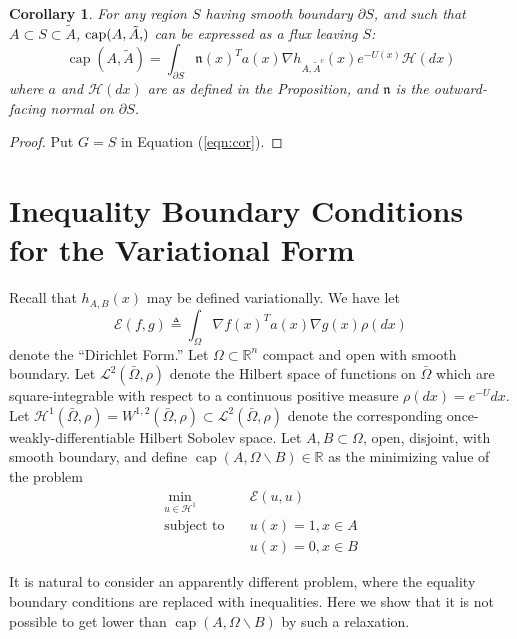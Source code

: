 \documentclass[nofootinbib,english, aip, jcp, priprint, graphicx,floatfix]{revtex4-1}
\newtheorem*{corollary*}{Corollary}
\theoremstyle{plain}
\theoremstyle{definition}
\theoremstyle{plain}
\newcommand{\normal}{{\mathfrak{n}}}
\newcommand{\capac}[2]{\ensuremath{\operatorname{cap}}(#1,#2)}
\newcommand{\hausdorffmeasure}{\mathscr{H}(dx)}
\newcommand{\tA}{{\tilde A}}
\begin{document}
\begin{corollary*}
For any region $S$ having smooth boundary $\partial S$, and such that $A\subset S \subset \tilde A$, $\capac{A,\tA}$ can be expressed as a flux leaving $S$:
\begin{equation*}
\ensuremath{\operatorname{cap}} (A, \tilde{A}) = \int_{\partial S}   \normal(x)^T a (x) \nabla h_{A, \tilde{A}^c} (x)e^{- U (x)} \hausdorffmeasure
\end{equation*}
where $a$ and $\hausdorffmeasure$ are as defined in the Proposition, and  $\normal$ is the outward-facing normal on $\partial S$.
\end{corollary*}
\begin{proof}
Put $G=S$ in Equation (\ref{eqn:cor}).
\end{proof}

%
%
%
%
%
%
%
%
%
%

\section{Inequality Boundary Conditions for the Variational Form}
\label{sec:inequalityboundaryvar}

Recall that $h_{A,B}(x)$ may be defined variationally.  We have let 
%
\[
\mathscr{E}(f,g)\triangleq \int_\Omega \nabla f(x)^T a(x) \nabla g(x) \rho(dx)
\]
%
denote the ``Dirichlet Form.''  Let $\Omega \subset \mathbb{R}^n$ compact and open with smooth boundary.  Let $\mathscr L^2(\bar \Omega,\rho)$ denote the Hilbert space of functions on $\bar \Omega$ which are square-integrable with respect to a continuous positive measure $\rho(dx)=e^{-U}dx$.  Let $\mathcal{H}^1(\bar \Omega,\rho)=W^{1,2}(\bar \Omega,\rho) \subset \mathscr{L}^2(\bar \Omega,\rho)$ denote the corresponding once-weakly-differentiable Hilbert Sobolev space.  Let $A,B\subset \Omega$, open, disjoint, with smooth boundary, and define $\capac{A}{\Omega \backslash B} \in \mathbb{R}$ as the minimizing value of the problem
    \begin{align*}
    \min_{u \in \mathcal H^1} \quad & \mathscr{E}(u,u) \\
    \mbox{subject to} \quad & u(x)=1,x\in A \\
     & u(x)=0,x\in B
    \end{align*}

It is natural to consider an apparently different problem, where the equality boundary conditions are replaced with inequalities.  Here we show that it is not possible to get lower than $\capac{A}{\Omega \backslash B}$ by such a relaxation.
\end{document}

